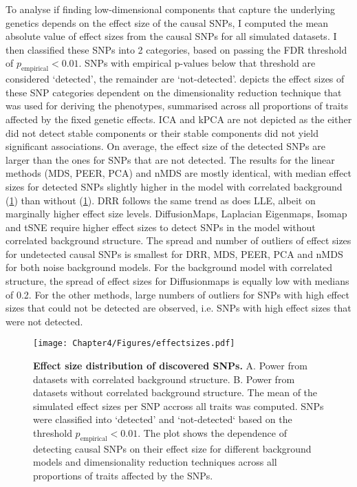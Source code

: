 To analyse if finding low-dimensional components that capture the underlying genetics depends on the effect size of the causal SNPs, I computed the mean absolute value of effect sizes from the causal SNPs for all simulated datasets. I then classified these SNPs into \num{2} categories, based on passing the FDR threshold of \(p_\text{empirical} < 0.01\). SNPs with empirical p-values below that threshold are considered `detected', the remainder are `not-detected'.  depicts the effect sizes of these SNP categories dependent on the dimensionality reduction technique that was used for deriving the phenotypes, summarised across all proportions of traits affected by the fixed genetic effects. ICA and kPCA are not depicted as the either did not detect stable components or their stable components did not yield significant associations. On average, the effect size of the detected SNPs are larger than the ones for SNPs that are not detected. The results for the linear methods (MDS, PEER, PCA) and nMDS are mostly identical, with median effect sizes for detected SNPs slightly higher in the model with correlated background (\cref{fig:effectsizes-dimRed}) than without (\cref{fig:effectsizes-dimRed}). DRR follows the same trend as does LLE, albeit on marginally higher effect size levels. DiffusionMaps, Laplacian Eigenmaps, Isomap and tSNE require higher effect sizes to detect SNPs in the model without correlated background structure. The spread and number of outliers of effect sizes for undetected causal SNPs is smallest for DRR, MDS, PEER, PCA and nMDS for both noise background models. For the background model with correlated structure, the spread of effect sizes for Diffusionmaps is equally low with medians of \num{0.2}. For the other methods, large numbers of outliers for SNPs with high effect sizes that could not be detected are observed, i.e. SNPs with high effect sizes that were not detected.

 


\begin{figure}[hbtp]
	\centering
	\texttt{[image: Chapter4/Figures/effectsizes.pdf]}
	\caption[\textbf{Effect size distribution of discovered SNPs.}]{\textbf{Effect size distribution of discovered SNPs. } A. Power from datasets with correlated background structure. B. Power from datasets without correlated background structure. The mean of the simulated effect sizes per SNP accross all traits was computed. SNPs were classified into `detected' and `not-detected` based on the threshold \(p_\text{empirical} < 0.01\). The plot shows the dependence of detecting causal SNPs on their effect size for different background models and dimensionality reduction techniques across all proportions of traits affected by the SNPs.} 
	 	\label{fig:effectsizes-dimRed}
\end{figure}

